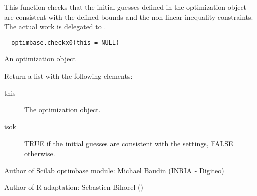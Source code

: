 %
\begin{Description}\relax
This function checks that the initial guesses defined in the optimization
object are consistent with the defined bounds and the non linear inequality
constraints. The actual work is delegated to .
\end{Description}
%
\begin{Usage}
\begin{verbatim}
  optimbase.checkx0(this = NULL)
\end{verbatim}
\end{Usage}
%
\begin{Arguments}
\begin{ldescription}
\item[\code{this}] An optimization object
\end{ldescription}
\end{Arguments}
%
\begin{Value}
Return a list with the following elements: \begin{description}

\item[this] The optimization object.
\item[isok] TRUE if the initial guesses are consistent with the settings,
FALSE otherwise.

\end{description}

\end{Value}
%
\begin{Author}\relax
Author of Scilab optimbase module: Michael Baudin (INRIA - Digiteo)

Author of R adaptation: Sebastien Bihorel ()
\end{Author}
%
\begin{SeeAlso}\relax
{}
\end{SeeAlso}
